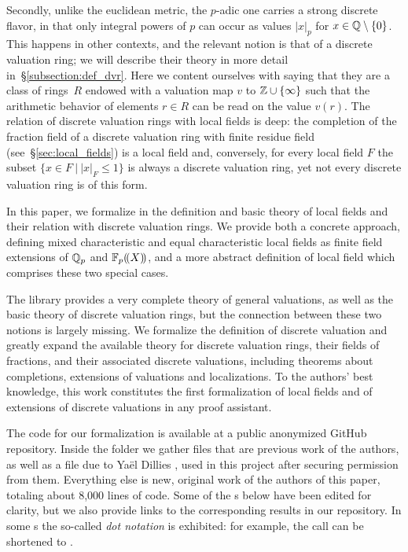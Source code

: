 \documentclass[sigplan,10pt, nonacm, review]{acmart}
\begin{document}
Secondly, unlike the euclidean metric, the $p$-adic one carries a strong discrete flavor, in that only integral powers of $p$ can occur as values $\lvert x\rvert_p$ for $x\in\mathbb{Q}\setminus\{0\}$. This happens in other contexts, and the relevant notion is that of a discrete valuation ring; we will describe their theory in more detail in~\S\ref{subsection:def_dvr}. Here we content ourselves with saying that they are a class of rings~$R$ endowed with a valuation map $v$ to $\mathbb{Z}\cup\{\infty\}$ such that the arithmetic behavior of elements $r\in R$ can be read on the value $v(r)$. The relation of discrete valuation rings with local fields is deep: the completion of the fraction field of a discrete valuation ring with finite residue field (see~\S\ref{sec:local_fields}) is a local field and, conversely, for every local field $F$ the subset $\{x \in F \:\vert\: \lvert x\rvert_F\leq 1\}$ is always a discrete valuation ring, yet not every discrete valuation ring is of this form.

In this paper, we formalize in \lean the definition and basic theory of local fields and their relation with discrete valuation rings. We provide both a concrete approach, defining mixed characteristic and equal characteristic local fields as finite field extensions of $\mathbb{Q}_p$ and ${\mathbb{F}_{p}}(\!(X)\!)$, and a more abstract definition of local field which comprises these two special cases. 

The \mathlib library provides 
a very complete theory of general valuations, as well as the basic theory of discrete valuation rings, but the connection between these two notions is largely missing. We formalize the definition of discrete valuation and greatly expand the available theory for discrete valuation rings, their fields of fractions, and their associated discrete valuations, including theorems about completions, extensions of valuations and localizations.
To the authors' best knowledge, this work constitutes the first formalization of local fields and of extensions of discrete valuations in any proof assistant.

The \lean[\empty] code for our formalization is available at a public anonymized GitHub repository\href{https://github.com/LCFT-Lean/local_fields}{\extlink}. Inside the folder \href{https://github.com/LCFT-Lean/local_fields/tree/master/src/from_mathlib}{\extlink} we gather files that are previous work of the authors, as well as a file due to Yaël Dillies \href{https://github.com/LCFT-Lean/local_fields/blob/master/src/from_mathlib/PR18604_well_founded.lean}{\extlink}, used in this project after securing permission from them. Everything else is new, original work of the authors of this paper, totaling about 8,000 lines of code. Some of the \LClistingname s below have been edited for clarity, but we also provide links to the corresponding results in our repository. In some \LClistingname s the so-called \emph{dot notation} is exhibited: for example, the call  can be shortened to .
\end{document}
